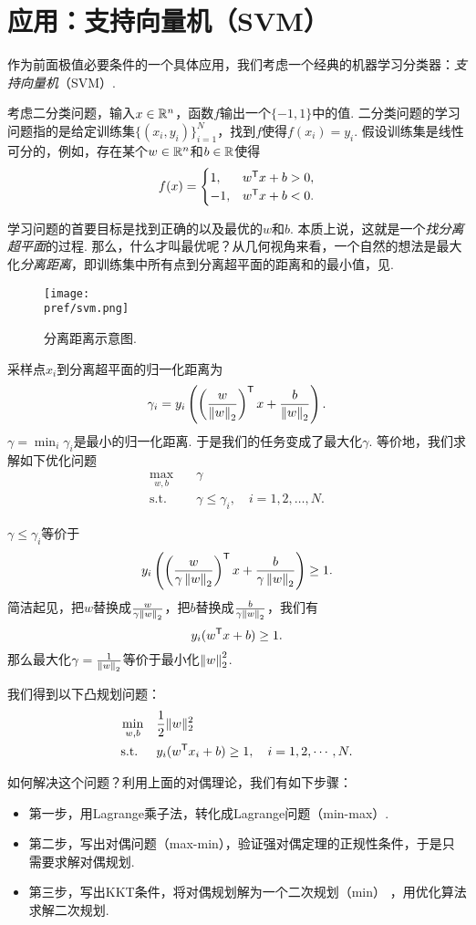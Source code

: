 \section{应用：支持向量机（SVM）}

作为前面极值必要条件的一个具体应用，我们考虑一个经典的机器学习分类器：\emph{支持向量机}（SVM）. 

考虑二分类问题，输入$x\in \mathbb{R}^n$，函数$f$输出一个$\{-1,1\}$中的值. 二分类问题的学习问题指的是给定训练集$\{(x_i,y_i)\}_{i=1}^N$，找到$f$使得$f(x_i)=y_i$. 假设训练集是线性可分的，例如，存在某个$w\in \mathbb{R}^n$和$b\in \mathbb{R}$使得
    $$f(x)=\begin{cases}
		1,& w^{\mathsf{T}} x+b>0,\\
		-1, &w^{\mathsf{T}} x+b<0.
	\end{cases}$$

学习问题的首要目标是找到正确的以及最优的$w$和$b$. 本质上说，这就是一个\emph{找分离超平面}的过程. 那么，什么才叫最优呢？从几何视角来看，一个自然的想法是最大化\emph{分离距离}，即训练集中所有点到分离超平面的距离和的最小值，见.
\begin{figure}
    \centering
    \texttt{[image: \\pref/svm.png]}
    \caption{分离距离示意图.}
    \label{fig:svm}
\end{figure}

采样点$x_i$到分离超平面的归一化距离为
    $$\gamma_i=y_i\left(\left(\frac{w}{\left\|w\right\|_2}\right)^{\mathsf{T}} x+\frac{b}{\left\|w\right\|_2}\right).$$
$\gamma=\min_i\gamma_i$是最小的归一化距离. 于是我们的任务变成了最大化$\gamma$. 等价地，我们求解如下优化问题
\begin{align*}
    \max_{w,b}\quad&\gamma \\
    \text{s.t.}\quad&\gamma\le\gamma_i,\quad i=1,2,\dots,N.
\end{align*}

$\gamma\le\gamma_i$等价于$$y_i\left(\left(\frac{w}{\gamma\left\|w\right\|_2}\right)^{\mathsf{T}} x+\frac{b}{\gamma\left\|w\right\|_2}\right)\geq 1.$$
简洁起见，把$w$替换成$\frac{w}{\gamma\left\|w\right\|_2}$，把$b$替换成$\frac{b}{\gamma\left\|w\right\|_2}$，我们有$$y_i(w^{\mathsf{T}} x+b)\geq 1.$$
那么最大化$\gamma=\frac{1}{\left\|w\right\|_2}$等价于最小化$\left\|w\right\|_2^2$. 

我们得到以下凸规划问题：
\begin{align*}
    \min_{w,b}\quad&\frac{1}{2}\|w\|_2^2\\
    \text{s.t. }\quad &y_i(w^{\mathsf{T}} x_i+b)\geq 1,\quad i=1,2,\cdots, N.
\end{align*}

如何解决这个问题？利用上面的对偶理论，我们有如下步骤：
\begin{itemize}
    \item 第一步，用Lagrange乘子法，转化成Lagrange问题（min-max）.
    \item 第二步，写出对偶问题（max-min），验证强对偶定理的正规性条件，于是只需要求解对偶规划.
    \item 第三步，写出KKT条件，将对偶规划解为一个二次规划（min） ，用优化算法求解二次规划.
\end{itemize}

\endgroup